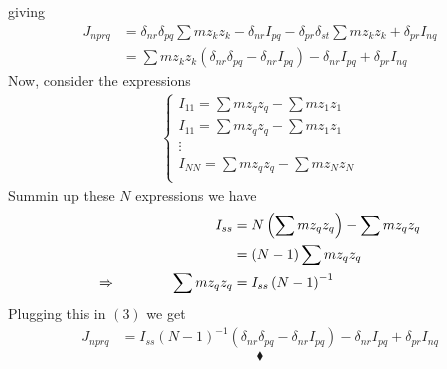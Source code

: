 giving 
\begin{align}
J_{nprq}& =  \delta_{nr} \delta_{pq}\sum m z_k z_k-\delta_{nr}I_{pq} - \delta_{pr} \delta_{st}\sum m z_k z_k+\delta_{pr}I_{nq} \\
&= \sum m z_k z_k\left( \delta_{nr} \delta_{pq}- \delta_{nr}I_{pq}\right)-\delta_{nr}I_{pq} +\delta_{pr}I_{nq}
\end{align}
Now, consider the expressions 
\begin{align}
\left\{\begin{array}{l}
I_{11}= \sum m z_q z_q - \sum m z_1 z_1\\
I_{11}= \sum m z_q z_q - \sum m z_1 z_1\\
\vdots\\
I_{NN} = \sum m z_q z_q - \sum m z_N z_N\\
\end{array}\right.
\end{align}
Summin up these $N$ expressions we have
\begin{align}
I_{ss} &= N\left( \sum m z_q z_q \right) - \sum m z_q z_q\\
&= \left( N-1  \right)\sum m z_q z_q \\
\Rightarrow\quad\quad\quad\quad \sum m z_q z_q &= I_{ss} \left( N-1  \right)^{-1}
\end{align}
Plugging this in $(3)$ we get
\begin{align}
J_{nprq}
&= I_{ss} \left( N-1  \right)^{-1}\left( \delta_{nr} \delta_{pq}- \delta_{nr}I_{pq}\right)-\delta_{nr}I_{pq} +\delta_{pr}I_{nq}
\end{align}
$$\blacklozenge$$
\newpage


